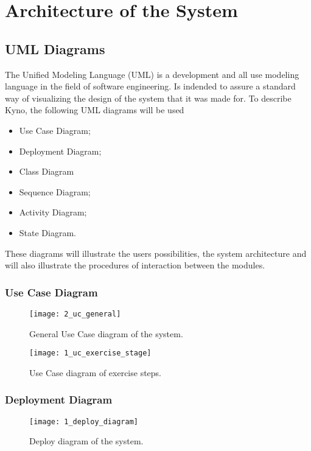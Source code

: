 \section{Architecture of the System}
\subsection{UML Diagrams}
The Unified Modeling Language (UML) is a development and all use modeling language in the field of software engineering. Is indended to assure a standard way of visualizing the design of the system that it was made for.
To describe Kyno, the following UML diagrams will be used
\begin{itemize}
\item Use Case Diagram;
\item Deployment Diagram;
\item Class Diagram
\item Sequence Diagram;
\item Activity Diagram;
\item State Diagram.

\end{itemize}
These diagrams will illustrate the users possibilities, the system architecture and will also illustrate the procedures of interaction between the modules.

\subsubsection{Use Case Diagram}

\begin{figure}[!h]
\centering
\texttt{[image: 2\_uc\_general]}
\caption{General Use Case diagram of the system.}\label{uc_general}
\end{figure}

\begin{figure}[!h]
\centering
\texttt{[image: 1\_uc\_exercise\_stage]}
\caption{Use Case diagram of exercise steps.}\label{uc_exercise}
\end{figure}

\clearpage
\subsubsection{Deployment Diagram}

\begin{figure}[!h]
\centering
\texttt{[image: 1\_deploy\_diagram]}
\caption{Deploy diagram of the system.}\label{deploy_diagram}
\end{figure}

